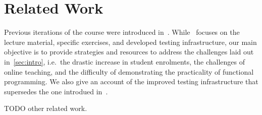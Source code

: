 \section{Related Work}\label{sec:related_work}

Previous iterations of the course were introduced in~\cite{next_1100}.
While~\cite{next_1100} focuses on the lecture material,
specific exercises, and developed testing infrastructure,
our main objective is to provide strategies and resources to address
the challenges laid out in~\cref{sec:intro},
i.e.\ the drastic increase in student enrolments,
the challenges of online teaching,
and the difficulty of demonstrating the practicality of functional programming.
We also give an account of the improved testing infrastructure
that supersedes the one introdued in~\cite{next_1100}.

TODO other related work.
